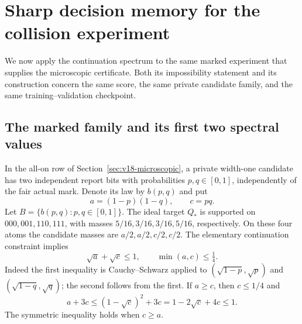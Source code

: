 \section{Sharp decision memory for the collision experiment}
\label{sec:v20-physical}
We now apply the continuation spectrum to the same marked experiment
that supplies the microscopic certificate. Both its impossibility
statement and its construction concern the same score, the same private
candidate family, and the same training--validation checkpoint.

\subsection{The marked family and its first two spectral values}
In the all-on row of Section~\ref{sec:v18-microscopic}, a private
width-one candidate has two independent report bits with probabilities
$p,q\in[0,1]$, independently of the fair actual mark. Denote its law by
$b(p,q)$ and put
\[
 a=(1-p)(1-q),\qquad c=pq.
\]
Let $B=\{b(p,q):p,q\in[0,1]\}$. The ideal target $Q_*$ is supported
on $000,001,110,111$, with masses $5/16,3/16,3/16,5/16$, respectively.
On these four atoms the candidate masses are $a/2,a/2,c/2,c/2$.
The elementary continuation constraint implies
\begin{equation}\label{eq:v20-root}
 \sqrt a+\sqrt c\le1,\qquad \min(a,c)\le\tfrac14.
\end{equation}
Indeed the first inequality is Cauchy--Schwarz applied to
$(\sqrt{1-p},\sqrt p)$ and $(\sqrt{1-q},\sqrt q)$; the second follows
from the first. If $a\ge c$, then $c\le1/4$ and
\begin{equation}\label{eq:v20-linear}
 a+3c\le(1-\sqrt c)^2+3c
             =1-2\sqrt c+4c\le1.
\end{equation}
The symmetric inequality holds when $c\ge a$.

